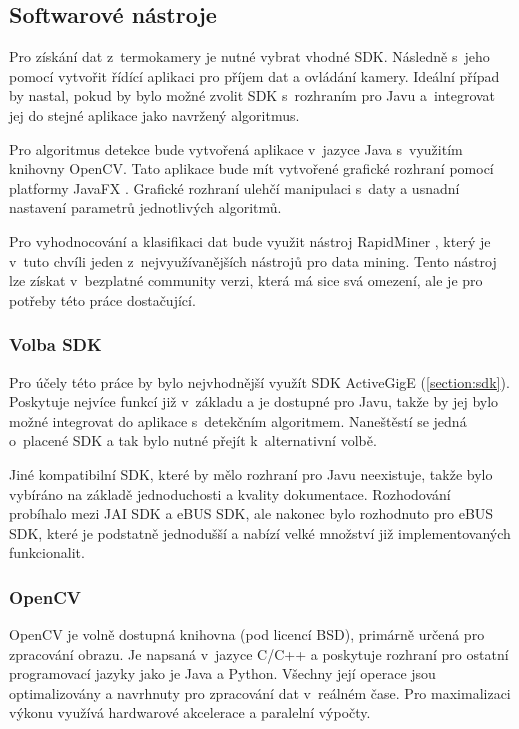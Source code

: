 	\subsection{Softwarové nástroje}
    Pro získání dat z~termokamery je nutné vybrat vhodné SDK. Následně s~jeho pomocí vytvořit řídící aplikaci pro příjem dat a ovládání kamery. Ideální případ by nastal, pokud by bylo možné zvolit SDK s~rozhraním pro Javu a~integrovat jej do stejné aplikace jako navržený algoritmus.
    
    Pro algoritmus detekce bude vytvořená aplikace v~jazyce Java s~využitím knihovny OpenCV. Tato aplikace bude mít vytvořené grafické rozhraní pomocí platformy JavaFX \cite{javafx}. Grafické rozhraní ulehčí manipulaci s~daty a usnadní nastavení parametrů jednotlivých algoritmů.

Pro vyhodnocování a klasifikaci dat bude využit nástroj RapidMiner \cite{rapidminer}, který je v~tuto chvíli jeden z~nejvyužívanějších nástrojů pro data mining. Tento nástroj lze získat v~bezplatné community verzi, která má sice svá omezení, ale je pro potřeby této práce dostačující.
    
    \subsubsection{Volba SDK}
    Pro účely této práce by bylo nejvhodnější využít SDK ActiveGigE (\ref{section:sdk}). Poskytuje nejvíce funkcí již v~základu a je dostupné pro Javu, takže by jej bylo možné integrovat do aplikace s~detekčním algoritmem. Naneštěstí se jedná o~placené SDK a tak bylo nutné přejít k~alternativní volbě. 
    
    Jiné kompatibilní SDK, které by mělo rozhraní pro Javu neexistuje, takže bylo vybíráno na základě jednoduchosti a kvality dokumentace. Rozhodování probíhalo mezi JAI SDK a eBUS SDK, ale nakonec bylo rozhodnuto pro eBUS SDK, které je podstatně jednodušší a nabízí velké množství již implementovaných funkcionalit.
    
    \subsubsection{OpenCV}
    OpenCV \cite{opencv_library} je volně dostupná knihovna (pod licencí BSD), primárně určená pro zpracování obrazu. Je napsaná v~jazyce C/C++ a poskytuje rozhraní pro ostatní programovací jazyky jako je Java a Python. Všechny její operace jsou optimalizovány a navrhnuty pro zpracování dat v~reálném čase. Pro maximalizaci výkonu využívá hardwarové akcelerace a paralelní výpočty.